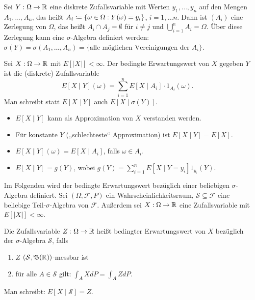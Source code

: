 \documentclass[a4paper,twoside,DIV15,BCOR12mm]{scrbook}
\newcommand{\cF}{\mathcal F}
\newcommand{\borel}{{\mathfrak B}}
\begin{document}
Sei $Y:\Omega\to\mathbb{R}$ eine diskrete Zufallsvariable mit Werten $y_1,\ldots,y_n$ auf den Mengen $A_1,\ldots,A_n$, das heißt $A_i \da \{\omega\in\Omega: Y(\omega) = y_i\}$, $i=1,\ldots n$. Dann ist $(A_i)$ eine Zerlegung von $\Omega$, das heißt $A_i\cap A_j= \emptyset$ für $i\ne j$ und $\bigcup_{i=1}^n A_i=\Omega$. Über diese Zerlegung kann eine $\sigma$-Algebra definiert werden: $\sigma(Y)=\sigma(A_1,\ldots,A_n)=\{\text{alle möglichen Vereinigungen der $A_i$}\}$.

\begin{definition}
Sei $X:\Omega \to \mathbb{R}$ mit $E[|X|]<\infty$. Der bedingte Erwartungswert von $X$ gegeben $Y$ ist die (diskrete) Zufallsvariable 
\[
E[X\mid Y](\omega) = \sum_{i=1}^n E[X\mid A_i] \cdot 1_{A_i}(\omega).
\]
Man schreibt statt $E[X\mid Y]$ auch $E[X\mid \sigma(Y)]$.
\end{definition}

\begin{bemerkung}
\begin{itemize}
\item $E[X\mid Y]$ kann als Approximation von $X$ verstanden werden.
\item Für konstante $Y$ („schlechteste“ Approximation) ist $E[X\mid Y] = E[X]$.
\item $E[X\mid Y](\omega) = E[X\mid A_i]$, falls $\omega\in A_i$.
\item $E[X\mid Y] = g(Y)$, wobei $g(Y) = \sum_{i=1}^n E[X\mid Y=y_i]1_{y_i}(Y)$.
\end{itemize}
\end{bemerkung}

Im Folgenden wird der bedingte Erwartungswert bezüglich einer beliebigen $\sigma$-Algebra definiert. Sei $(\Omega,\cF,P)$ ein Wahrscheinlichkeitsraum, $\mathcal S\subseteq \cF$ eine beliebige Teil-$\sigma$-Algebra von $\cF$. Außerdem sei $X:\Omega\to\mathbb{R}$ eine Zufallsvariable mit $E[|X|]<\infty$.

\begin{definition}
\label{def:2.1.5}Die Zufallsvariable $Z:\Omega\to\mathbb{R}$ heißt bedingter Erwartungswert von $X$ bezüglich der $\sigma$-Algebra $\mathcal S$, falls
\begin{enumerate}
\item $Z$ $(\mathcal S,\borel(\MdR))$-messbar ist
\item für alle $A\in \mathcal S$ gilt: $\int_A XdP = \int_AZ dP$.
\end{enumerate}
Man schreibt: $E[X\mid \mathcal S] = Z$.
\end{definition}
\end{document}
